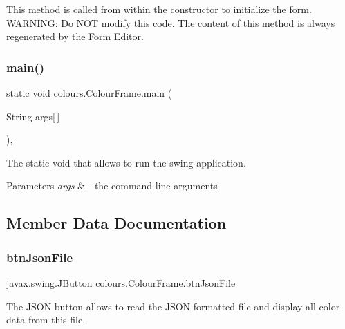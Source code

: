This method is called from within the constructor to initialize the form. W\+A\+R\+N\+I\+NG\+: Do N\+OT modify this code. The content of this method is always regenerated by the Form Editor. \mbox{\label{classcolours_1_1_colour_frame_a7f890970aa168fcb9791f1de589a5c2c}} 
\subsubsection{\texorpdfstring{main()}{main()}}
{\footnotesize\ttfamily static void colours.\+Colour\+Frame.\+main (\begin{DoxyParamCaption}\item[{String}]{args\mbox{[}$\,$\mbox{]} }\end{DoxyParamCaption})\hspace{0.3cm}{\ttfamily [inline]}, {\ttfamily [static]}}

The static void that allows to run the swing application. 
\begin{DoxyParams}{Parameters}
{\em args} & -\/ the command line arguments \\
\hline
\end{DoxyParams}


\subsection{Member Data Documentation}
\mbox{\label{classcolours_1_1_colour_frame_a1fe23149a50772dff538d0004e7cb1ee}} 
\subsubsection{\texorpdfstring{btn\+Json\+File}{btnJsonFile}}
{\footnotesize\ttfamily javax.\+swing.\+J\+Button colours.\+Colour\+Frame.\+btn\+Json\+File\hspace{0.3cm}{\ttfamily [private]}}

The J\+S\+ON button allows to read the J\+S\+ON formatted file and display all color data from this file. \mbox{\label{classcolours_1_1_colour_frame_a3465e8e9a196ae2a3249b5212e954594}} 

